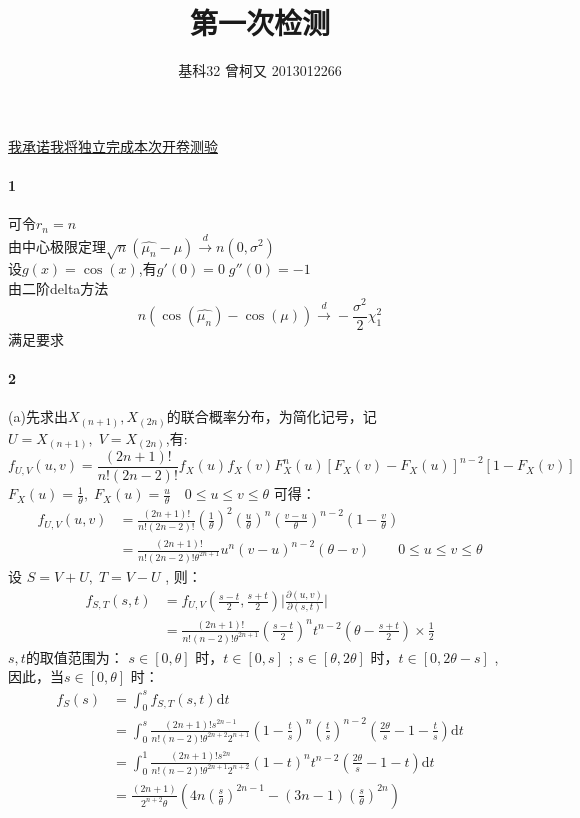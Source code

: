 \documentclass[11pt,a4paper]{ctexart}
\title{第一次检测}
\author{基科32 曾柯又 2013012266}
\begin{document}
\abovedisplayskip=5pt
\belowdisplayskip=5pt
\abovedisplayshortskip=0pt
\belowdisplayshortskip=0pt
\maketitle
\underline{我承诺我将独立完成本次开卷测验}
\paragraph{1}
可令$r_n = n$\\
由中心极限定理$\sqrt{n}(\hat{\mu_n} - \mu) \overset{d}{\to} n(0,\sigma^2)$\\
设\(g(x) = \cos(x)\),有\( g'(0) = 0 \; g''(0) = -1\)\\
由二阶delta方法\[ n(\cos(\hat{\mu_n}) - \cos(\mu) ) \overset{d}{\to} -\frac{\sigma^2}{2}\chi^2_1 \]
满足要求
 \paragraph{2}
(a)先求出\(X_{(n+1)} , X_{(2n)}\)的联合概率分布，为简化记号，记\(U = X_{(n+1)},\;V = X_{(2n)}\),有:
 \[ f_{U,V}(u,v) = \frac{(2n + 1)!}{n!(2n - 2)!}f_X(u)f_X(v)F_X^n(u)[F_X(v) - F_X(u)]^{n - 2}[1 - F_X(v)]\]
 \(F_X(u) = \frac{1}{\theta},\;F_X(u) = \frac{u}{\theta}\quad 0 \leq u \leq v \leq \theta\)  可得：
 \begin{equation*}
\begin{split}
f_{U,V}(u,v) & = \frac{(2n + 1)!}{n!(2n - 2)!}(\frac{1}{\theta})^2(\frac{u}{\theta})^n(\frac{v - u}{\theta})^{n - 2}(1 -\frac{v}{\theta} )\\
& = \frac{(2n + 1)!}{n!(2n - 2)!\theta^{2n + 1}}u^n(v - u)^{n - 2}(\theta - v)  \qquad 0 \leq u \leq v \leq \theta 
\end{split}
 \end{equation*}
 设 \(S =  V + U ,\; T = V - U\) , 则：
 \begin{equation*}
 \begin{split}
 f_{S,T}(s,t) & = f_{U,V}(\frac{s - t}{2},\frac{s + t}{2})\Big|\frac{\partial(u,v)}{\partial(s,t)}\Big|\\
 & = \frac{(2n + 1)!}{n!(n-2)!\theta^{2n + 1}}(\frac{s - t}{2})^nt^{n - 2}(\theta - \frac{s + t}{2})\times\frac{1}{2}
 \end{split}
 \end{equation*}
 $s,t$的取值范围为： 
\(s \in [0, \theta]\) 时，\( t \in [0,s]\) ; \(s \in [\theta, 2\theta]\) 时，\( t \in [0,2\theta - s]\) ,因此，当\(s \in [0, \theta]\) 时：
\begin{equation*}
\begin{split}
f_S(s) & = \int_{0}^{s}f_{S,T}(s,t)\mathrm{d}t \\
&= \int_{0}^{s}\frac{(2n + 1)!s^{2n - 1}}{n!(n-2)!\theta^{2n + 2}2^{n + 1}}(1 - \frac{t}{s})^n(\frac{t}{s})^{n - 2}(\frac{2\theta}{s} - 1 -  \frac{t}{s})\mathrm{d}t\\
& = \int_{0}^{1}\frac{(2n + 1)!s^{2n}}{n!(n-2)!\theta^{2n + 1}2^{n + 2}}(1 - t)^nt^{n - 2}(\frac{2\theta}{s} - 1 -  t)\mathrm{d}t\\
& = \frac{(2n + 1)}{2^{n + 2}\theta}(4n(\frac{s}{\theta})^{2n - 1} - (3n - 1)(\frac{s}{\theta})^{2n})
\end{split}
\end{equation*}
\end{document}
